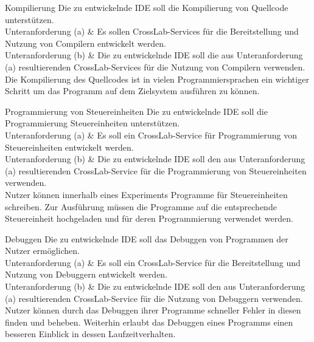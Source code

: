 \newpage

\mbox{}\vfill

\begin{requirement}{Kompilierung}
    \reqdescription Die zu entwickelnde IDE soll die Kompilierung von Quellcode unterstützen. \\
    Unteranforderung (a) & Es sollen CrossLab-Services für die Bereitstellung und Nutzung von Compilern entwickelt werden. \\
    Unteranforderung (b) & Die zu entwickelnde IDE soll die aus Unteranforderung (a) resultierenden CrossLab-Services für die Nutzung von Compilern verwenden. \\
    \reqrationale Die Kompilierung des Quellcodes ist in vielen Programmiersprachen ein wichtiger Schritt um das Programm auf dem Zielsystem ausführen zu können. \\
\end{requirement}

\vfill

\begin{requirement}{Programmierung von Steuereinheiten}
    \reqdescription Die zu entwickelnde IDE soll die Programmierung Steuereinheiten unterstützen. \\
    Unteranforderung (a) & Es soll ein CrossLab-Service für Programmierung von Steuereinheiten entwickelt werden. \\
    Unteranforderung (b) & Die zu entwickelnde IDE soll den aus Unteranforderung (a) resultierenden CrossLab-Service für die Programmierung von Steuereinheiten verwenden. \\
    \reqrationale Nutzer können innerhalb eines Experiments Programme für Steuereinheiten schreiben. Zur Ausführung müssen die Programme auf die entsprechende Steuereinheit hochgeladen und für deren Programmierung verwendet werden. \\
\end{requirement}

\vfill\mbox{}

\newpage

\begin{requirement}{Debuggen}
    \reqdescription Die zu entwickelnde IDE soll das Debuggen von Programmen der Nutzer ermöglichen. \\
    Unteranforderung (a) & Es soll ein CrossLab-Service für die Bereitstellung und Nutzung von Debuggern entwickelt werden. \\
    Unteranforderung (b) & Die zu entwickelnde IDE soll den aus Unteranforderung (a) resultierenden CrossLab-Service für die Nutzung von Debuggern verwenden. \\
    \reqrationale Nutzer können durch das Debuggen ihrer Programme schneller Fehler in diesen finden und beheben. Weiterhin erlaubt das Debuggen eines Programms einen besseren Einblick in dessen Laufzeitverhalten. \\
\end{requirement}

